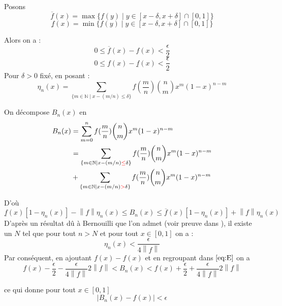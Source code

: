 \documentclass[
	10pt, %
]{beamer}
\begin{document}
\begin{frame}
	Posons 
	\begin{equation*}
		\overline{f}(x) = \max\{f(y) \mid y \in [x-\delta, x+\delta] \cap [0,1]\}
	\end{equation*}
	\begin{equation*}
		\underline{f}(x) = \min\{f(y) \mid y \in [x-\delta, x+\delta] \cap [0,1]\}
	\end{equation*}

Alors on a : 
\begin{equation*}
	0 \leq \overline{f}(x) - f(x) < \frac{\epsilon}{2}
\end{equation*}
\begin{equation*}
	0 \leq f(x) - \underline{f}(x) < \frac{\epsilon}{2}
\end{equation*}
Pour \( \delta > 0  \) fixé, en posant :
\begin{equation*}
	\eta_n(x) = \sum_{\{m \in \mathbb{N} \mid x - (m/n) \leq \delta \}} f(\frac{m}{n}) \binom{n}{m} x^{m}(1-x)^{n-m}
\end{equation*}

On décompose \( B_n(x) \) en 
\begin{align*}
	B_n(x) &= \sum_{m=0}^{n} f(\frac{m}{n}) \binom{n}{m} x^{m}(1-x)^{n-m} \\
	       &= \sum_{\{m \in \mathbb{N} \mid x - (m/n) \mathcolor{red}{\leq} \delta \}} f(\frac{m}{n}) \binom{n}{m} x^{m}(1-x)^{n-m} \\
	       &+ \sum_{\{m \in \mathbb{N} \mid x - (m/n) \mathcolor{red}{>} \delta \}} f(\frac{m}{n}) \binom{n}{m} x^{m}(1-x)^{n-m} \\
\end{align*}
\end{frame}
\begin{frame}
	D'où 
	\begin{equation}
		\underline{f}(x)[1 - \eta_n(x)] - {\left\lVert f \right\rVert} \eta_n(x)
		\leq B_n(x) \leq \overline{f}(x)[1-\eta_n(x)] + {\left\lVert f \right\rVert} \eta_n(x) \label{eq:E}
	\end{equation}
	D'après un résultat dû à Bernouilli que l'on admet (voir preuve dans \cite{pinkus2000approximation}), il existe un \( N \) tel que pour tout \( n > N \) et pour tout \( x \in [0,1] \) on a :
	\begin{equation}
		\eta_n(x) < \frac{\epsilon}{4 {\left\lVert f \right\rVert}} \label{eq:B}
	\end{equation}
	Par conséquent, en ajoutant \( f(x) - f(x) \) et en regroupant dans \( \eqref{eq:E} \) on a
	\begin{equation*}
		f(x)-\frac{\epsilon}{2} - 
		\frac{\epsilon}{4 {\left\lVert f \right\rVert}} 2{\left\lVert f \right\rVert}
		< B_n(x) < f(x) + \frac{\epsilon}{2}+\frac{\epsilon}{4 {\left\lVert f \right\rVert}} 2{\left\lVert f \right\rVert}
	\end{equation*}

	ce qui donne pour tout \( x \in [0,1] \)
	\begin{equation*}
		{\left\lvert B_n(x) - f(x) \right\rvert} < \epsilon
	\end{equation*}
	\end{frame}
\end{document}
